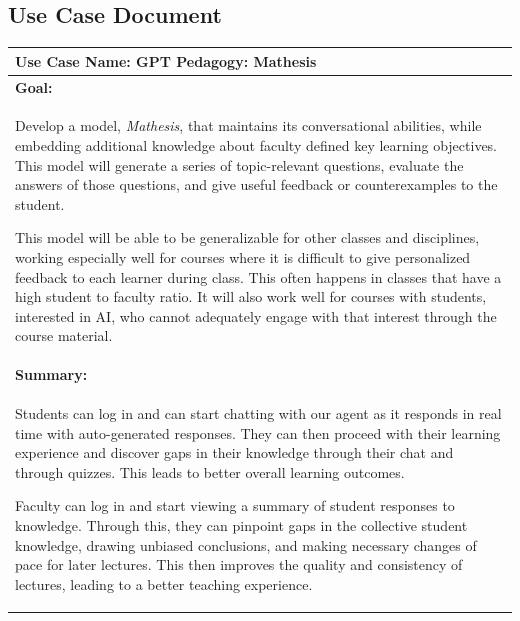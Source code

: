 \documentclass[12pt,a4paper]{article}
\begin{document}
    \begin{appendices}

        \setcounter{section}{0}
        \section{Use Case Document}

        \begin{table}[H]
        \label{tab:useCaseDoc1}
        \centering
        \def\arraystretch{1.4}
        \begin{tabular}{|p{13cm}|}
            \hline
            \textbf{Use Case Name:} GPT Pedagogy: Mathesis\\\hline

            \textbf{Goal:}\\

            Develop a model, \textit{Mathesis}, that maintains its conversational abilities,
            while embedding additional knowledge about faculty defined key learning objectives.
            This model will generate a series of topic-relevant questions, evaluate the answers of
            those questions, and give useful feedback or counterexamples to the student.

            This model will be able to be generalizable for other classes and disciplines,
            working especially well for courses where it is difficult to give personalized
            feedback to each learner during class. This often happens in classes that
            have a high student to faculty ratio. It will also work well for courses with students,
            interested in AI, who cannot adequately engage with that interest through the course
            material.\\\hline

            \textbf{Summary:}\\

            Students can log in and can start chatting with our agent as it
            responds in real time with auto-generated responses. They can then proceed with their
            learning experience and discover gaps in their knowledge through their chat and through
            quizzes.  This leads to better overall learning outcomes.

            Faculty can log in and start viewing a summary of student responses to knowledge.
            Through this, they can pinpoint gaps in the collective student knowledge, drawing
            unbiased conclusions, and making necessary changes of pace for later lectures.  This then
            improves the quality and consistency of lectures, leading to a better teaching experience.
            \\\hline


\end{tabular}
\end{table}
\end{appendices}
\end{document}
